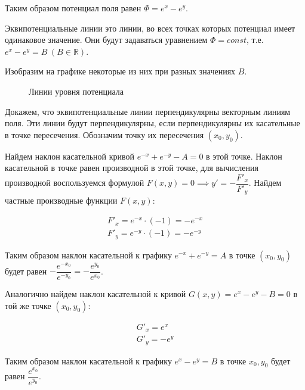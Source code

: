 Таким образом потенциал поля равен \(\Phi = e^x - e^y\).

\bigskip

Эквипотенциальные линии это линии, во всех точках которых потенциал имеет
одинаковое значение. Они будут задаваться уравнением \(\Phi = const\), т.е.
\(e^x - e^y = B \hspace{3pt} (B \in \mathbb{R})\).

Изобразим на графике некоторые из них при разных значениях \(B\).

\begin{figure}[!htbp]
  \centering
  \caption{Линии уровня потенциала}
\end{figure}

\bigskip

Докажем, что эквипотенциальные линии перпендикулярны векторным линиям поля. Эти
линии будут перпендикулярны, если перпендикулярны их касательные в точке
пересечения. Обозначим точку их пересечения \((x_0, y_0)\).

Найдем наклон касательной кривой \(e^{-x} + e^{-y} - A = 0\) в этой точке.
Наклон касательной в точке равен производной в этой точке, для вычисления
производной воспользуемся формулой
\(F(x, y) = 0 \implies y' = -\dfrac{F'_x}{F'_y}\). Найдем частные производные
функции \(F(x, y)\):

\begin{equation*}\begin{split}
    F'_x = e^{-x} \cdot (-1) = -e^{-x} \\
    F'_y = e^{-y} \cdot (-1) = -e^{-y}
  \end{split}\end{equation*}

Таким образом наклон касательной к графику \(e^{-x} + e^{-y} = A\) в точке
\((x_0, y_0)\) будет равен
\(-\dfrac{e^{-x_0}}{e^{-y_0}} = -\dfrac{e^{y_0}}{e^{x_0}}\).

Аналогично найдем наклон касательной к кривой \(G(x, y) = e^x - e^y - B = 0\) в
той же точке \((x_0, y_0)\):

\begin{equation*}\begin{split}
    G'_x = e^x \\
    G'_y = -e^y
  \end{split}\end{equation*}

Таким образом наклон касательной к графику \(e^x - e^y = B\) в точке
\(x_0, y_0\) будет равен \(\dfrac{e^{x_0}}{e^{y_0}}\).

